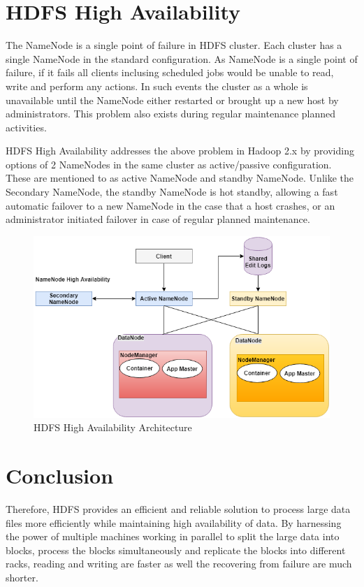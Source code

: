 \section{HDFS High Availability} 

The NameNode is a single point of failure in HDFS cluster.
Each cluster has a single NameNode in the standard configuration.
As NameNode is a single point of failure, if it fails all clients
inclusing scheduled jobs would be unable to read, write and perform
any actions. In such events the cluster as a whole is unavailable
until the NameNode either restarted or brought up a new host by
administrators. This problem also exists during regular maintenance 
planned activities.

HDFS High Availability addresses the above problem in Hadoop 2.x by providing
options of 2 NameNodes in the same cluster as active/passive configuration.
These are mentioned to as active NameNode and standby NameNode.  
Unlike the Secondary NameNode, the standby NameNode is hot standby, 
allowing a fast automatic failover to a new NameNode in 
the case that a host crashes, or an administrator initiated failover
in case of regular planned maintenance. 


\begin{figure}[!ht]
  \centering
\centering\includegraphics[width=\columnwidth]{images/HDFS_HA.png}
  \caption{HDFS High Availability Architecture}\label{f:hdfs-ha}
\end{figure}


\section {Conclusion}

Therefore, HDFS provides an efficient and reliable solution to process
large data files more efficiently while maintaining high availability
of data. By harnessing the power of multiple machines working in
parallel to split the large data into blocks, process the blocks
simultaneously and replicate the blocks into different racks, reading
and writing are faster as well the recovering from failure are much
shorter.


 